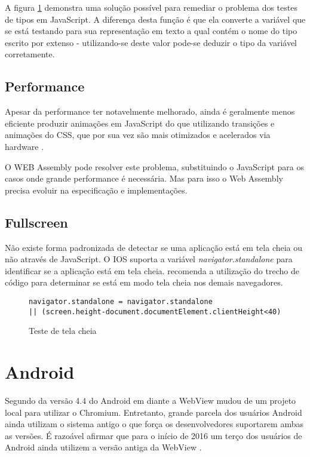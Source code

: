 A figura \ref{fig:fixJSTypes} demonstra uma solução possível para
remediar o problema dos testes de tipos em JavaScript. A diferença
desta função é que ela converte a variável que se está testando
para sua representação em texto a qual contém o nome do tipo escrito
por extenso - utilizando-se deste valor pode-se deduzir o tipo da
variável corretamente.

\subsection{Performance}

Apesar da performance ter notavelmente melhorado, ainda é geralmente
menos eficiente produzir animações em JavaScript do que utilizando
transições e animações do CSS, que por sua vez são mais otimizados
e acelerados via hardware \autocite{html5mostwanted}.

O WEB Assembly pode resolver este problema, substituindo o JavaScript
para os casos onde grande performance é necessária. Mas para isso o
Web Assembly precisa evoluir na especificação e implementações.

\subsection{Fullscreen}

Não existe forma padronizada de detectar se uma aplicação está em
tela cheia ou não através de JavaScript. O IOS suporta a variável
\textit{navigator.standalone } para identificar se a aplicação está
em tela cheia. \cite{homescreenwebapps} recomenda a utilização do
trecho de código para determinar se está em modo tela cheia
nos demais navegadores.

\begin{figure}[H]
\centering
\begin{verbatim}
navigator.standalone = navigator.standalone 
|| (screen.height-document.documentElement.clientHeight<40)
\end{verbatim}
\caption{Teste de tela cheia}
\label{fig:fixJSTypes}
\end{figure}


\section{Android}

Segundo \cite{chromeWebView} da versão 4.4 do Android em diante a
WebView mudou de um projeto local para utilizar o Chromium. Entretanto,
grande parcela dos usuários Android ainda utilizam o sistema antigo o
que força os desenvolvedores suportarem ambas as versões. É razoável
afirmar que para o início de 2016 um terço dos usuários de Android
ainda utilizem a versão antiga da WebView \cite{chromeWebView}.

